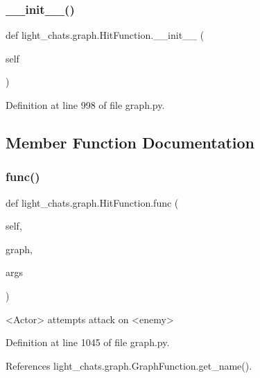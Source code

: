 \subsubsection{\texorpdfstring{\+\_\+\+\_\+init\+\_\+\+\_\+()}{\_\_init\_\_()}}
{\footnotesize\ttfamily def light\+\_\+chats.\+graph.\+Hit\+Function.\+\_\+\+\_\+init\+\_\+\+\_\+ (\begin{DoxyParamCaption}\item[{}]{self }\end{DoxyParamCaption})}



Definition at line 998 of file graph.\+py.



\subsection{Member Function Documentation}
\mbox{\label{classlight__chats_1_1graph_1_1HitFunction_a5154430a7ff1b987446b904c8238eef2}} 
\subsubsection{\texorpdfstring{func()}{func()}}
{\footnotesize\ttfamily def light\+\_\+chats.\+graph.\+Hit\+Function.\+func (\begin{DoxyParamCaption}\item[{}]{self,  }\item[{}]{graph,  }\item[{}]{args }\end{DoxyParamCaption})}

\begin{DoxyVerb}<Actor> attempts attack on <enemy>\end{DoxyVerb}
 

Definition at line 1045 of file graph.\+py.



References light\+\_\+chats.\+graph.\+Graph\+Function.\+get\+\_\+name().

